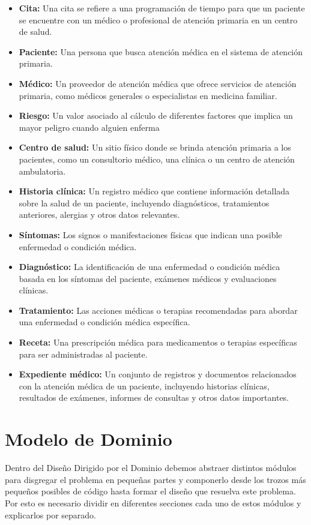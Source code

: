 \begin{itemize}
\item \textbf{Cita:} Una cita se refiere a una programación de tiempo para que un paciente se encuentre con un médico o profesional de atención primaria en un centro de salud.
\item \textbf{Paciente:} Una persona que busca atención médica en el sistema de atención primaria.
\item \textbf{Médico:} Un proveedor de atención médica que ofrece servicios de atención primaria, como médicos generales o especialistas en medicina familiar.
\item \textbf{Riesgo:} Un valor asociado al cálculo de diferentes factores que implica un mayor peligro cuando alguien enferma
\item \textbf{Centro de salud:} Un sitio físico donde se brinda atención primaria a los pacientes, como un consultorio médico, una clínica o un centro de atención ambulatoria.
\item \textbf{Historia clínica:} Un registro médico que contiene información detallada sobre la salud de un paciente, incluyendo diagnósticos, tratamientos anteriores, alergias y otros datos relevantes.
\item \textbf{Síntomas:} Los signos o manifestaciones físicas que indican una posible enfermedad o condición médica.
\item \textbf{Diagnóstico:} La identificación de una enfermedad o condición médica basada en los síntomas del paciente, exámenes médicos y evaluaciones clínicas.
\item \textbf{Tratamiento:} Las acciones médicas o terapias recomendadas para abordar una enfermedad o condición médica específica.
\item \textbf{Receta:} Una prescripción médica para medicamentos o terapias específicas para ser administradas al paciente.
\item \textbf{Expediente médico:} Un conjunto de registros y documentos relacionados con la atención médica de un paciente, incluyendo historias clínicas, resultados de exámenes, informes de consultas y otros datos importantes.
\end{itemize}

\section{Modelo de Dominio}
Dentro del Diseño Dirigido por el Dominio debemos abstraer distintos módulos para disgregar el problema en pequeñas partes
y componerlo desde los trozos más pequeños posibles de código hasta formar el diseño que resuelva este problema.
Por esto es necesario dividir en diferentes secciones cada uno de estos módulos y explicarlos por separado.


